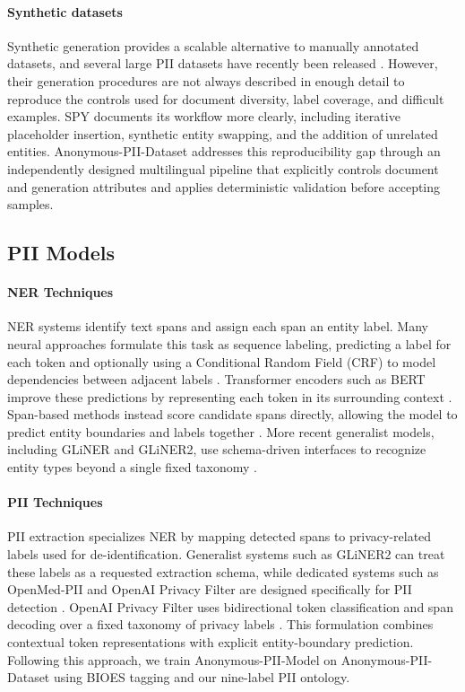 \documentclass[11pt]{article}
\begin{document}
\paragraph{Synthetic datasets} Synthetic generation provides a scalable alternative to manually annotated datasets, and several large PII datasets have recently been released \cite{ai4privacy_openpii_1_5m_2026,gretel-pii-docs-en-v1,nemotron-pii}. However, their generation procedures are not always described in enough detail to reproduce the controls used for document diversity, label coverage, and difficult examples. SPY \cite{savkin-etal-2025-spy} documents its workflow more clearly, including iterative placeholder insertion, synthetic entity swapping, and the addition of unrelated entities. Anonymous-PII-Dataset addresses this reproducibility gap through an independently designed multilingual pipeline that explicitly controls document and generation attributes and applies deterministic validation before accepting samples.

\subsection{PII Models}

\paragraph{NER Techniques}

NER systems identify text spans and assign each span an entity label. Many neural approaches formulate this task as sequence labeling, predicting a label for each token and optionally using a Conditional Random Field (CRF) to model dependencies between adjacent labels \cite{souza2019portuguese}. Transformer encoders such as BERT improve these predictions by representing each token in its surrounding context \cite{devlin2019bert}. Span-based methods instead score candidate spans directly, allowing the model to predict entity boundaries and labels together \cite{eberts2019span}. More recent generalist models, including GLiNER and GLiNER2, use schema-driven interfaces to recognize entity types beyond a single fixed taxonomy \cite{zaratiana2023gliner,zaratiana2025gliner2efficientmultitaskinformation}.

\paragraph{PII Techniques} PII extraction specializes NER by mapping detected spans to privacy-related labels used for de-identification. Generalist systems such as GLiNER2 can treat these labels as a requested extraction schema, while dedicated systems such as OpenMed-PII and OpenAI Privacy Filter are designed specifically for PII detection \cite{zaratiana2025gliner2efficientmultitaskinformation,openmed-pii-2026,openai2026privacyfilter}. OpenAI Privacy Filter uses bidirectional token classification and span decoding over a fixed taxonomy of privacy labels \cite{openai2026privacyfilter}. This formulation combines contextual token representations with explicit entity-boundary prediction. Following this approach, we train Anonymous-PII-Model on Anonymous-PII-Dataset using BIOES tagging and our nine-label PII ontology.
\end{document}
